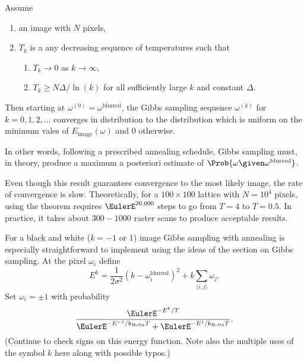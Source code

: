 \documentclass[12pt]{article}
\newcommand{\kT}{{\text k}_{\text{Boltz}}T}
\begin{document}
\begin{theorem}
    Assume
    \begin{enumerate}
        \item
            an image with \( N \) pixels,
        \item
            \( T_k \) is a any decreasing sequence of temperatures such
            that
            \begin{enumerate}
                \item
                    \( T_k \to 0 \) as \( k \to \infty \),
                \item
                    \( T_k \ge N \Delta/\ln(k) \) for all sufficiently
                    large \( k \) and constant \( \Delta \).
            \end{enumerate}
    \end{enumerate}
    Then starting at \( \omega^{(0)} = \omega^{\text{blurred}} \), the
    Gibbs sampling sequence \( \omega^{(k)} \) for \( k=0,1,2, \dots \)
    converges in distribution to the distribution which is uniform on
    the minimum vales of \( E_{\text{image}}(\omega) \) and \( 0 \)
    otherwise.
\end{theorem}

In other words, following a prescribed annealing schedule, Gibbs
sampling must, in theory, produce a maximum a posteriori estimate of \(
\Prob{\omega \given \omega^{\text{blurred}}} \).

Even though this result guarantees convergence to the most likely image,
the rate of convergence is slow.  Theoretically, for a \( 100 \times 100
\) lattice with \( N = 10^4 \) pixels, using the theorem requires \(
\EulerE^{20{,}000} \) steps to go from \( T = 4 \) to \( T = 0.5 \).  In
practice, it takes about \( 300 - 1000 \) raster scans to produce
acceptable results.

For a black and white (\( k = -1 \) or \( 1 \)) image Gibbs sampling with
annealing is especially straightforward to implement using the ideas of
the section on Gibbs sampling.  At the pixel \( \omega_i \) define
\[
    E^k = \frac{1}{2 \sigma^2}( k - \omega_i^{\text{blurred}})^2 + k
    \sum\limits_{\langle i,j\rangle} \omega_j.
\] Set \( \omega_i = \pm 1 \) with probability
\[
    \frac{\EulerE^{-E^k/T}}{\EulerE^{-E^{-1}/\kT} + \EulerE^{-E^1/\kT}}.
\] (Continue to check signs on this energy function.  Note also the
multiple uses of the symbol \( k \) here along with possible typos.)

\end{document}
